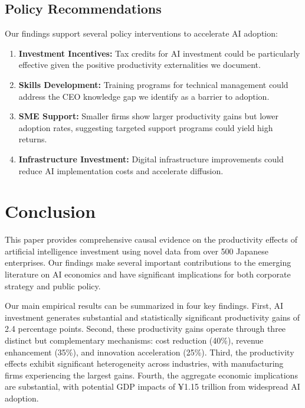 \documentclass[12pt, a4paper]{article}
\begin{document}
\subsection{Policy Recommendations}

Our findings support several policy interventions to accelerate AI adoption:

\begin{enumerate}
\item \textbf{Investment Incentives:} Tax credits for AI investment could be particularly effective given the positive productivity externalities we document.

\item \textbf{Skills Development:} Training programs for technical management could address the CEO knowledge gap we identify as a barrier to adoption.

\item \textbf{SME Support:} Smaller firms show larger productivity gains but lower adoption rates, suggesting targeted support programs could yield high returns.

\item \textbf{Infrastructure Investment:} Digital infrastructure improvements could reduce AI implementation costs and accelerate diffusion.
\end{enumerate}

\section{Conclusion}

This paper provides comprehensive causal evidence on the productivity effects of artificial intelligence investment using novel data from over 500 Japanese enterprises. Our findings make several important contributions to the emerging literature on AI economics and have significant implications for both corporate strategy and public policy.

Our main empirical results can be summarized in four key findings. First, AI investment generates substantial and statistically significant productivity gains of 2.4 percentage points. Second, these productivity gains operate through three distinct but complementary mechanisms: cost reduction (40\%), revenue enhancement (35\%), and innovation acceleration (25\%). Third, the productivity effects exhibit significant heterogeneity across industries, with manufacturing firms experiencing the largest gains. Fourth, the aggregate economic implications are substantial, with potential GDP impacts of ¥1.15 trillion from widespread AI adoption.
\end{document}
